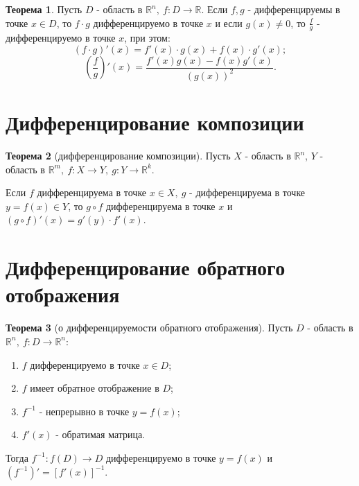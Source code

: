 \documentclass{report}
\theoremstyle{definition}
\newtheorem*{theorem}{Теорема}
\begin{document}
\begin{theorem}
    Пусть $D$ - область в $\mathbb{R}^n, \ f:D\rightarrow\mathbb{R}$. Если $f,g$ - дифференцируемы в точке $x \in D$,
    то $f\cdot g$ дифференцируемо в точке $x$ и если $g(x) \ne 0$, то $\frac{f}{g}$ - дифференцируемо в точке $x$, при
    этом:
    \begin{equation*}
      (f\cdot g)'(x) = f'(x)\cdot g(x) + f(x)\cdot g'(x);
    \end{equation*}
    \begin{equation*}
      (\frac{f}{g})'(x) = \frac{f'(x)g(x) - f(x)g'(x)}{(g(x))^2}.
    \end{equation*}
  \end{theorem}

\section{Дифференцирование композиции}

\begin{theorem}[дифференцирование композиции]
    Пусть $X$ - область в $\mathbb{R}^n$, $Y$ - область в $\mathbb{R}^m, \ f:X\rightarrow Y, \ g:Y\rightarrow\mathbb{R}^k$.

    Если $f$ дифференцируема в точке $x \in X, \ g$ - дифференцируема в точке $y = f(x) \in Y$, то $g \circ f$ дифференцируема в точке $x$ и $(g \circ f)'(x) = g'(y) \cdot f'(x)$.
\end{theorem}

\section{Дифференцирование обратного отображения}

\begin{theorem}[о дифференцируемости обратного отображения]
    Пусть $D$ - область в $\mathbb{R}^n, \ f: D \rightarrow \mathbb{R}^n:$
    \begin{enumerate}
        \item $f$ дифференцируемо в точке $x \in D$;
        \item $f$ имеет обратное отображение в $D$;
        \item $f^{-1}$ - непрерывно в точке $y = f(x)$;
        \item $f'(x)$ - обратимая матрица.
    \end{enumerate}

    Тогда $f^{-1}:f(D)\rightarrow D$ дифференцируемо в точке $y = f(x)$ и $(f^{-1})' = [f'(x)]^{-1}$.
\end{theorem}
\end{document}
